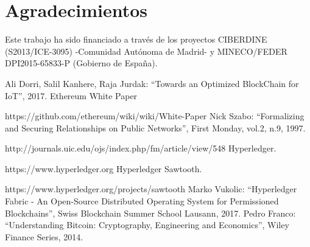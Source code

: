 \documentclass[10pt,conference,a4paper]{IEEEtran}
\begin{document}
\section*{Agradecimientos}

Este trabajo ha sido financiado a través de los proyectos
CIBERDINE (S2013/ICE-3095) -Comunidad Autónoma de Madrid- y
MINECO/FEDER DPI2015-65833-P (Gobierno de España).



\begin{thebibliography}{99}
Ali Dorri, Salil Kanhere, Raja Jurdak: ``Towards an Optimized BlockChain for IoT'', 2017.
Ethereum White Paper

https://github.com/ethereum/wiki/wiki/White-Paper
Nick Szabo: ``Formalizing and Securing Relationships on Public Networks'', First Monday, vol.2, n.9, 1997.

http://journals.uic.edu/ojs/index.php/fm/article/view/548
Hyperledger.

https://www.hyperledger.org
Hyperledger Sawtooth.

https://www.hyperledger.org/projects/sawtooth
Marko Vukolic: ``Hyperledger Fabric - An Open-Source Distributed Operating System for Permissioned Blockchains'', Swiss Blockchain Summer School Lausann, 2017.
Pedro Franco: ``Understanding Bitcoin: Cryptography, Engineering and Economics'', Wiley Finance Series, 2014.

\end{thebibliography}
\end{document}
